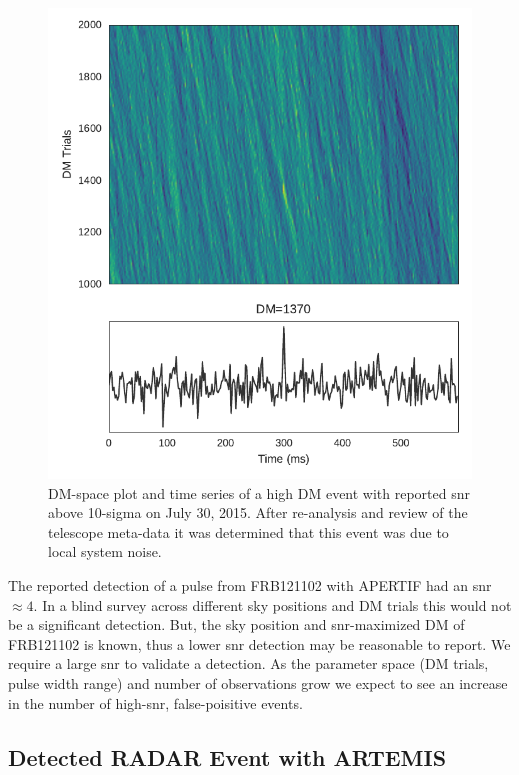 \documentclass[a4paper,fleqn,usenatbib]{mnras}
\begin{document}
\begin{figure}
    \includegraphics[width=1.0\linewidth]{figures/D20150730_buf23_Beam6_dmtrial.pdf}
    \caption{DM-space plot and time series of a high DM event with reported
    \gls{snr} above 10-sigma on July 30, 2015. After re-analysis and review of
    the telescope meta-data it was determined that this event was due to local
    system noise.
    }
    \label{fig:D20150730}
\end{figure}

The reported detection of a pulse from FRB121102 with APERTIF \citep{atel10693}
had an \gls{snr}$\approx 4$. In a blind survey across different sky positions
and DM trials this would not be a significant detection. But, the sky position
and \gls{snr}-maximized DM of FRB121102 is known, thus a lower \gls{snr}
detection may be reasonable to report.  We require a large \gls{snr} to validate
a detection.  As the parameter space (DM trials, pulse width range) and number
of observations grow we expect to see an increase in the number of
high-\gls{snr}, false-poisitive events.

\subsection{Detected RADAR Event with ARTEMIS}
\label{sec:LOFAR_RADAR}
\end{document}

